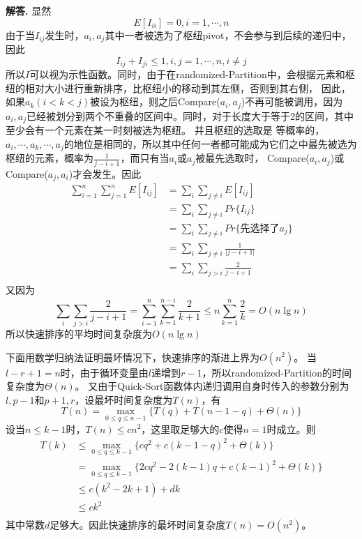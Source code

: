 \documentclass[12pt, a4paper, oneside]{article}
\newenvironment{solution}{\par\noindent\textbf{解答. }}{}
\begin{document}
\begin{solution}
显然
\[E[I_{ii}]=0,i=1,\cdots,n\]
由于当$I_{ij}$发生时，$a_i,a_j$其中一者被选为了枢纽pivot，不会参与到后续的递归中，因此
\[I_{ij}+I_{ji}\leq 1,i,j=1,\cdots,n,i\neq j\]
所以$I$可以视为示性函数。同时，由于在randomized-Partition中，会根据元素和枢纽的相对大小进行重新排序，比枢纽小的移动到其左侧，否则到其右侧，
因此，如果$a_k(i<k<j)$被设为枢纽，则之后Compare($a_i,a_j$)不再可能被调用，因为$a_i,a_j$已经被划分到两个不重叠的区间中。同时，对于长度大于等于2的区间，其中至少会有一个元素在某一时刻被选为枢纽。
并且枢纽的选取是
等概率的，$a_i,\cdots,a_k,\cdots,a_j$的地位是相同的，所以其中任何一者都可能成为它们之中最先被选为枢纽的元素，概率为$\frac{1}{j-i+1}$，而只有当$a_i$或$a_j$被最先选取时，
Compare($a_i,a_j$)或Compare($a_j,a_i$)才会发生。因此
\begin{align*}
 \sum_{i=1}^{n}\sum_{j=1}^{n}E[I_{ij}]& =   \sum_i\sum_{j\neq i}E[I_{ij}] \\
 & =   \sum_i\sum_{j\neq i}Pr\{I_{ij}\} \\
 & =   \sum_i\sum_{j\neq i}Pr\{\text{先选择了}a_j\}\\
 & =   \sum_i\sum_{j\neq i}\frac{1}{\lvert j-i+1\rvert}\\
 & =   \sum_i\sum_{j> i}\frac{2}{j-i+1}\\
\end{align*}
又因为
\[
    \sum_i\sum_{j> i}\frac{2}{j-i+1}=\sum_{i=1}^n\sum_{k=1}^{n-i}\frac{2}{k+1}\leq n\sum_{k=1}^{n}\frac{2}{k}=O(n\lg n)
  \]
  所以快速排序的平均时间复杂度为$O(n\lg n)$


下面用数学归纳法证明最坏情况下，快速排序的渐进上界为$O(n^2)$。
当$l-r+1=n$时，由于循环变量由$l$递增到$r-1$，所以randomized-Partition的时间
复杂度为$\Theta(n)$。
又由于Quick-Sort函数体内递归调用自身时传入的参数分别为$l,p-1$和$p+1,r$，设最坏时间复杂度为$T(n)$，有
\[T(n)=\max_{0\leq q\leq n-1}\{T(q)+T(n-1-q)+\Theta(n)\}\]
设当$n\leq k-1$时，$T(n)\leq cn^2$，这里取足够大的$c$使得$n=1$时成立。则
\begin{align*}
T(k)&\leq\max_{0\leq q\leq k-1}\{cq^2+c(k-1-q)^2+\Theta(k)\}\\
&=\max_{0\leq q\leq k-1}\{2cq^2-2(k-1)q+c(k-1)^2+\Theta(k)\}\\
&\leq c(k^2-2k+1)+dk\\
&\leq ck^2\\
\end{align*}
其中常数$d$足够大。因此快速排序的最坏时间复杂度$T(n)=O(n^2)$。
\end{solution}
\end{document}
